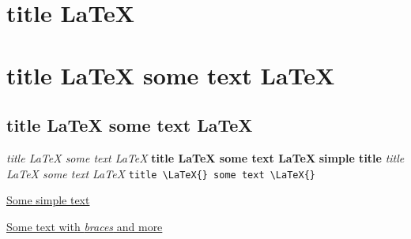 \documentclass{article}
\begin{document}
\chapter{title \LaTeX{}}
\chapter{title \LaTeX{} some text \LaTeX{}}
\section{title \LaTeX{} some text \LaTeX{}}
\emph{title \LaTeX{} some text \LaTeX{}}
\textbf{title \LaTeX{} some text \LaTeX{}}
\textbf{simple title}
\textit{title \LaTeX{} some text {\LaTeX{}}}
\verb!title \LaTeX{} some text \LaTeX{}!


\underline{Some simple text}

\underline{Some text with {\em braces} and more}
\end{document}
